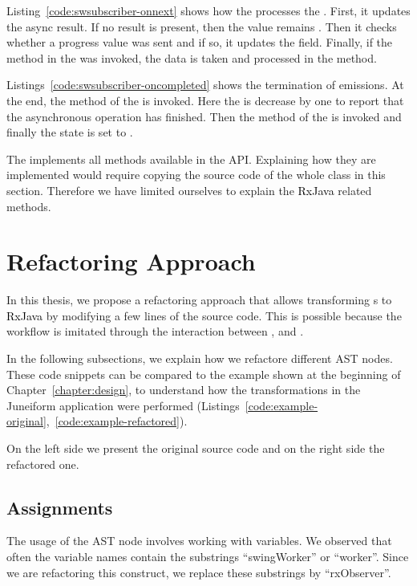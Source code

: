 \documentclass[type=bsc,accentcolor=tud9c]{tudthesis}
\newcommand{\framework}[1]{\textcolor{black}{#1}}
\begin{document}


Listing~\ref{code:swsubscriber-onnext} shows how the  processes the . First, it updates the async result. If no result is present, then the value remains . Then it checks whether a progress value was sent and if so, it updates the  field. Finally, if the  method in the  was invoked, the data is taken and processed in the  method.

Listings~\ref{code:swsubscriber-oncompleted} shows the termination of emissions. At the end, the  method of the  is invoked. Here the  is decrease by one to report that the asynchronous operation has finished. Then the  method of the  is invoked and finally the state is set to .



The  implements all methods available in the  API. Explaining how they are implemented would require copying the source code of the whole class in this section. Therefore we have limited ourselves to explain the \framework{RxJava} related methods.


\section{Refactoring Approach}
In this thesis, we propose a refactoring approach that allows transforming s to \framework{RxJava} by modifying a few lines of the source code. This is possible because the  workflow is imitated through the interaction between ,  and .

In the following subsections, we explain how we refactore different AST nodes. These code snippets can be compared to the example shown at the beginning of Chapter~\ref{chapter:design}, to understand how the transformations in the Juneiform application were performed (Listings~\ref{code:example-original},~\ref{code:example-refactored}).

On the left side we present the original source code and on the right side the refactored one.

\subsection{Assignments}
The usage of the AST node  involves working with variables. We observed that often the variable names contain the substrings ``swingWorker'' or     ``worker''. Since we are refactoring this construct, we replace these substrings by ``rxObserver''.
\end{document}
